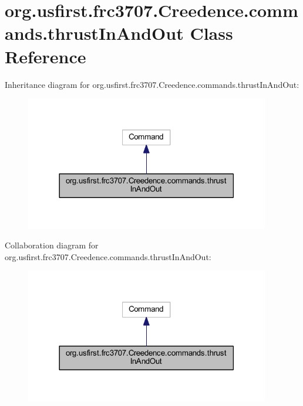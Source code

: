 \hypertarget{classorg_1_1usfirst_1_1frc3707_1_1_creedence_1_1commands_1_1thrust_in_and_out}{}\section{org.\+usfirst.\+frc3707.\+Creedence.\+commands.\+thrust\+In\+And\+Out Class Reference}
\label{classorg_1_1usfirst_1_1frc3707_1_1_creedence_1_1commands_1_1thrust_in_and_out}


Inheritance diagram for org.\+usfirst.\+frc3707.\+Creedence.\+commands.\+thrust\+In\+And\+Out\+:
\nopagebreak
\begin{figure}[H]
\begin{center}
\leavevmode
\includegraphics[width=302pt]{classorg_1_1usfirst_1_1frc3707_1_1_creedence_1_1commands_1_1thrust_in_and_out__inherit__graph}
\end{center}
\end{figure}


Collaboration diagram for org.\+usfirst.\+frc3707.\+Creedence.\+commands.\+thrust\+In\+And\+Out\+:
\nopagebreak
\begin{figure}[H]
\begin{center}
\leavevmode
\includegraphics[width=302pt]{classorg_1_1usfirst_1_1frc3707_1_1_creedence_1_1commands_1_1thrust_in_and_out__coll__graph}
\end{center}
\end{figure}
